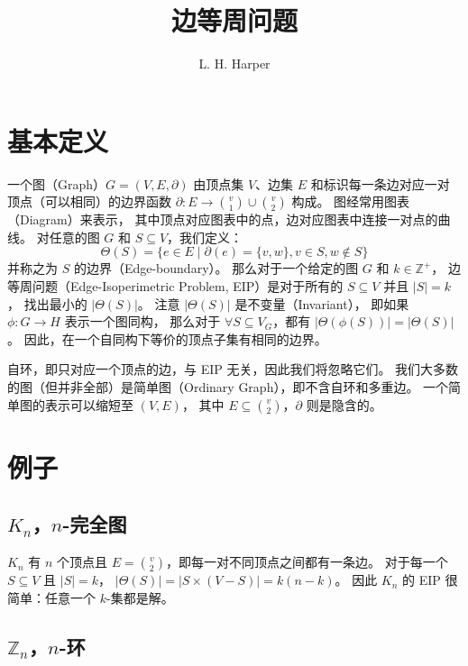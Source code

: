 \documentclass[12pt, a4paper]{article}
\author{L. H. Harper}
\date{}
\begin{document}
\title{边等周问题}
\maketitle

\section{基本定义}
\label{Section 1}

一个图（Graph）$G = (V, E, \partial)$ 由顶点集 $V$、边集 $E$
和标识每一条边对应一对顶点（可以相同）的边界函数
$\partial \colon E \rightarrow \binom{v}{1} \cup \binom{v}{2}$ 构成。
图经常用图表（Diagram）来表示，
其中顶点对应图表中的点，边对应图表中连接一对点的曲线。
对任意的图 $G$ 和 $S \subseteq V$，我们定义：
\begin{equation*}
\Theta(S) = \{e \in E \mid \partial(e) = \{v, w\}, v \in S, w \notin S\}
\end{equation*}
并称之为 $S$ 的边界（Edge-boundary）。
那么对于一个给定的图 $G$ 和 $k \in \mathbb{Z}^+$，
边等周问题（Edge-Isoperimetric Problem, EIP）是对于所有的 $S \subseteq V$ 并且 $|S| = k$，
找出最小的 $|\Theta(S)|$。
注意 $|\Theta(S)|$ 是不变量（Invariant），
即如果 $\phi \colon G \rightarrow H$ 表示一个图同构，
那么对于 $\forall S \subseteq V_G$，都有 $|\Theta(\phi(S))| = |\Theta(S)|$。
因此，在一个自同构下等价的顶点子集有相同的边界。

自环，即只对应一个顶点的边，与 EIP 无关，因此我们将忽略它们。
我们大多数的图（但并非全部）是简单图（Ordinary Graph），即不含自环和多重边。
一个简单图的表示可以缩短至 $(V, E)$，
其中 $E \subseteq \binom{v}{2}$，$\partial$ 则是隐含的。

\section{例子}
\label{Section 2}

\subsection{$K_n$，$n$-完全图}
\label{Subsection 2.1}

$K_n$ 有 $n$ 个顶点且 $E = \binom{v}{2}$，即每一对不同顶点之间都有一条边。
对于每一个 $S \subseteq V$ 且 $|S| = k$，
$|\Theta(S)| = |S \times (V − S)| = k(n − k)$。
因此 $K_n$ 的 EIP 很简单：任意一个 $k$-集都是解。

\subsection{$\mathbb{Z}_n$，$n$-环}
\label{Subsection 2.2}
\end{document}

